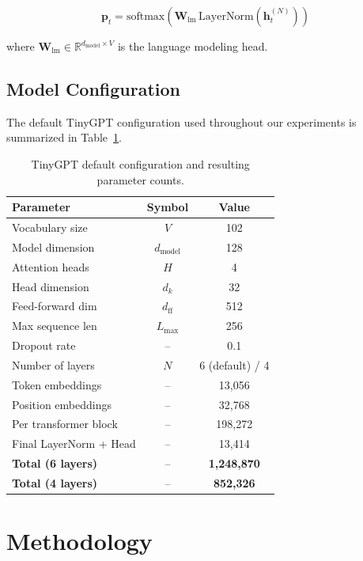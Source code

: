 \documentclass[conference]{IEEEtran}
\begin{document}
\begin{equation}
\mathbf{p}_t = \text{softmax}(\mathbf{W}_{\text{lm}}\, \text{LayerNorm}(\mathbf{h}_t^{(N)}))
\end{equation}

where $\mathbf{W}_{\text{lm}} \in \mathbb{R}^{d_{\text{model}} \times V}$ is the language modeling head.

\subsection{Model Configuration}

The default TinyGPT configuration used throughout our experiments is summarized in Table~\ref{tab:config}.

\begin{table}[t]
\centering
\caption{TinyGPT default configuration and resulting parameter counts.}
\label{tab:config}
\begin{tabular}{lcc}
\toprule
\textbf{Parameter} & \textbf{Symbol} & \textbf{Value} \\
\midrule
Vocabulary size  & $V$ & 102 \\
Model dimension  & $d_{\text{model}}$ & 128 \\
Attention heads  & $H$ & 4 \\
Head dimension   & $d_k$ & 32 \\
Feed-forward dim & $d_{\text{ff}}$ & 512 \\
Max sequence len & $L_{\max}$ & 256 \\
Dropout rate     & -- & 0.1 \\
Number of layers & $N$ & 6 (default) / 4 \\
\midrule
Token embeddings & -- & 13,056 \\
Position embeddings & -- & 32,768 \\
Per transformer block & -- & 198,272 \\
Final LayerNorm + Head & -- & 13,414 \\
\midrule
\textbf{Total (6 layers)} & -- & \textbf{1,248,870} \\
\textbf{Total (4 layers)} & -- & \textbf{852,326} \\
\bottomrule
\end{tabular}
\end{table}

\section{Methodology}
\label{sec:methodology}
\end{document}
